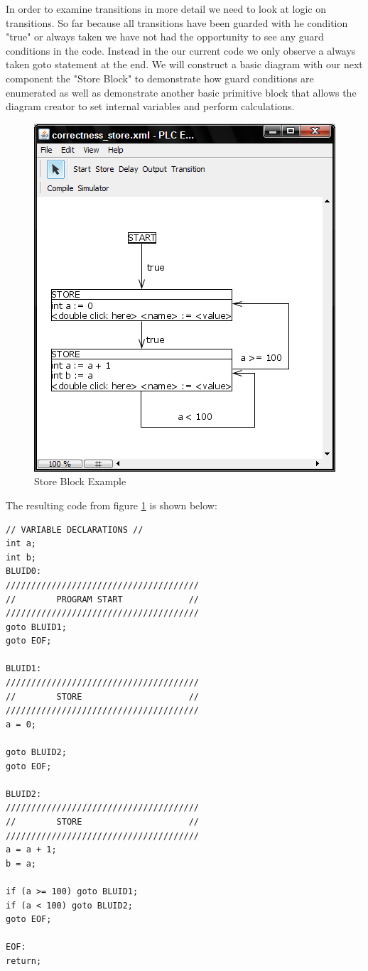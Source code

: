 In order to examine transitions in more detail we need to look at logic on transitions. So far because all transitions have been guarded with he condition "true" or always taken we have not had the opportunity to see any guard conditions in the code. Instead in the our current code we only observe a always taken goto statement at the end. We will construct a basic diagram with our next component the "Store Block" to demonstrate how guard conditions are enumerated as well as demonstrate another basic primitive block that allows the diagram creator to set internal variables and perform calculations.

\begin{figure}[htb]
	\centering
	\includegraphics[width=\imgmedphoto]{./images/correctness_ex_store.png}
	\caption{Store Block Example}
	\label{fig:correctness_ex_store}
\end{figure}

The resulting code from figure \ref{fig:correctness_ex_store} is shown below:

\begin{minipage}{\textwidth}
\begin{lstlisting}[frame=single]
// VARIABLE DECLARATIONS //
int a;
int b;
BLUID0:
//////////////////////////////////////
//        PROGRAM START             //
//////////////////////////////////////
goto BLUID1;
goto EOF;

BLUID1:
//////////////////////////////////////
//        STORE                     //
//////////////////////////////////////
a = 0;

goto BLUID2;
goto EOF;

BLUID2:
//////////////////////////////////////
//        STORE                     //
//////////////////////////////////////
a = a + 1;
b = a;

if (a >= 100) goto BLUID1;
if (a < 100) goto BLUID2;
goto EOF;

EOF:
return;
\end{lstlisting}
\end{minipage}

